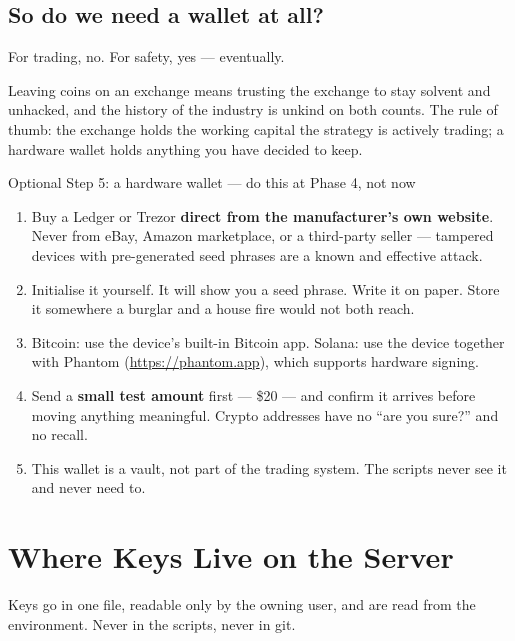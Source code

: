 \documentclass[11pt,a4paper]{article}
\begin{document}
\subsection{So do we need a wallet at all?}

For trading, no. For safety, yes --- eventually.

Leaving coins on an exchange means trusting the exchange to stay
solvent and unhacked, and the history of the industry is unkind on both
counts. The rule of thumb: the exchange holds the working capital the
strategy is actively trading; a hardware wallet holds anything you have
decided to keep.

\begin{kimbox}{Optional Step 5: a hardware wallet --- do this at Phase 4, not now}
\begin{enumerate}[leftmargin=1.6em, itemsep=3pt]
    \item Buy a Ledger or Trezor \textbf{direct from the
          manufacturer's own website}. Never from eBay, Amazon
          marketplace, or a third-party seller --- tampered devices with
          pre-generated seed phrases are a known and effective attack.
    \item Initialise it yourself. It will show you a seed phrase.
          Write it on paper. Store it somewhere a burglar and a house
          fire would not both reach.
    \item Bitcoin: use the device's built-in Bitcoin app.
          Solana: use the device together with Phantom
          (\url{https://phantom.app}), which supports hardware signing.
    \item Send a \textbf{small test amount} first --- \$20 --- and
          confirm it arrives before moving anything meaningful.
          Crypto addresses have no ``are you sure?'' and no recall.
    \item This wallet is a vault, not part of the trading system. The
          scripts never see it and never need to.
\end{enumerate}
\end{kimbox}

\section{Where Keys Live on the Server}
\label{sec:keys}

Keys go in one file, readable only by the owning user, and are read from
the environment. Never in the scripts, never in git.
\end{document}
